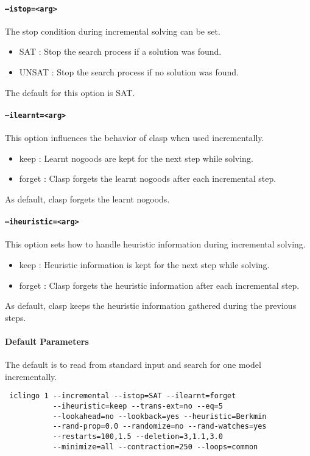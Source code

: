 \documentclass[a4paper,10pt]{article}
\begin{document}
\paragraph{\texttt{--istop=<arg>}}
The stop condition during incremental solving can be set.
\begin{itemize}
 \item SAT    : Stop the search process if a solution was found.
 \item UNSAT  : Stop the search process if no solution was found.
\end{itemize}
The default for this option is SAT.
\paragraph{\texttt{--ilearnt=<arg>}}
This option influences the behavior of clasp when used incrementally.
\begin{itemize}
 \item keep   : Learnt nogoods are kept for the next step while solving.
 \item forget : Clasp forgets the learnt nogoods after each incremental step.
\end{itemize}
As default, clasp forgets the learnt nogoods.
\paragraph{\texttt{--iheuristic=<arg>}}
This option sets how to handle heuristic information during incremental solving.
\begin{itemize}
 \item keep   : Heuristic information is kept for the next step while solving.
 \item forget : Clasp forgets the heuristic information after each incremental step.
\end{itemize}
As default, clasp keeps the heuristic information gathered during the previous steps.
\paragraph{Default Parameters}
The default is to read from standard input and search for one model incrementally.
\begin{verbatim}
 iclingo 1 --incremental --istop=SAT --ilearnt=forget 
           --iheuristic=keep --trans-ext=no --eq=5 
           --lookahead=no --lookback=yes --heuristic=Berkmin
           --rand-prop=0.0 --randomize=no --rand-watches=yes
           --restarts=100,1.5 --deletion=3,1.1,3.0
           --minimize=all --contraction=250 --loops=common

\end{verbatim}
\end{document}
